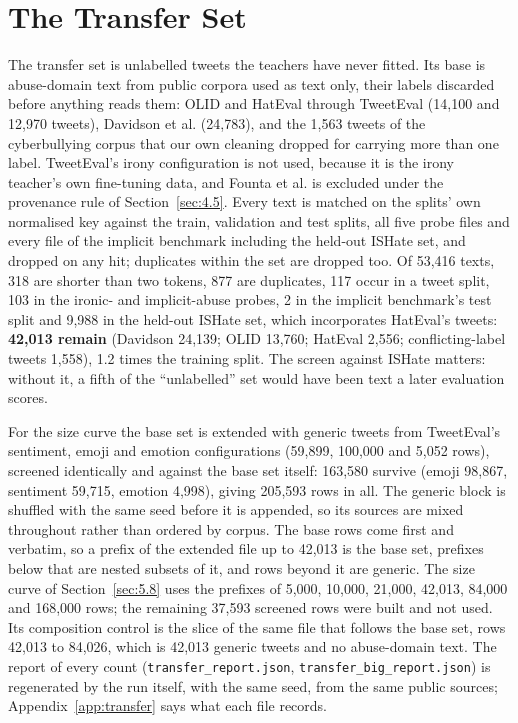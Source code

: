 \section{The Transfer Set}
\label{sec:4.4}
The transfer set is unlabelled tweets the teachers have never fitted. Its base is abuse-domain text
from public corpora used as text only, their labels discarded before anything reads them: OLID
\cite{zampieri2019olid} and HatEval \cite{basile2019hateval} through TweetEval
\cite{barbieri2020tweeteval} (14,100 and 12,970 tweets), Davidson et al.
\cite{davidson2017automated} (24,783), and the 1,563 tweets of the cyberbullying corpus that our own
cleaning dropped for carrying more than one label. TweetEval's irony configuration is not used,
because it is the irony teacher's own fine-tuning data, and Founta et al. \cite{founta2018large} is
excluded under the provenance rule of Section~\ref{sec:4.5}. Every text is matched on the splits'
own normalised key against the train, validation and test splits, all five probe files and every
file of the implicit benchmark including the held-out ISHate set, and dropped on any hit; duplicates
within the set are dropped too. Of 53,416 texts, 318 are shorter than two tokens, 877 are
duplicates, 117 occur in a tweet split, 103 in the ironic- and implicit-abuse probes, 2 in the
implicit benchmark's test split and 9,988 in the held-out ISHate set, which incorporates HatEval's
tweets: \textbf{42,013 remain} (Davidson 24,139; OLID 13,760; HatEval 2,556; conflicting-label
tweets 1,558), 1.2 times the training split. The screen against ISHate matters: without it, a fifth
of the ``unlabelled'' set would have been text a later evaluation scores.

For the size curve the base set is extended with generic tweets from TweetEval's sentiment, emoji
and emotion configurations (59,899, 100,000 and 5,052 rows), screened identically and against the
base set itself: 163,580 survive (emoji 98,867, sentiment 59,715, emotion 4,998), giving 205,593
rows in all. The generic block is shuffled with the same seed before it is appended, so its sources
are mixed throughout rather than ordered by corpus. The base rows come first and verbatim, so a
prefix of the extended file up to 42,013 is the base set, prefixes below that are nested subsets of
it, and rows beyond it are generic. The size curve of Section~\ref{sec:5.8} uses the prefixes of
5,000, 10,000, 21,000, 42,013, 84,000 and 168,000 rows; the remaining 37,593 screened rows were
built and not used. Its composition control is the slice of the same file that follows the base set,
rows 42,013 to 84,026, which is 42,013 generic tweets and no abuse-domain text. The report of every
count (\texttt{transfer\_report.json}, \texttt{transfer\_big\_report.json}) is regenerated by the
run itself, with the same seed, from the same public sources; Appendix~\ref{app:transfer} says what
each file records.

